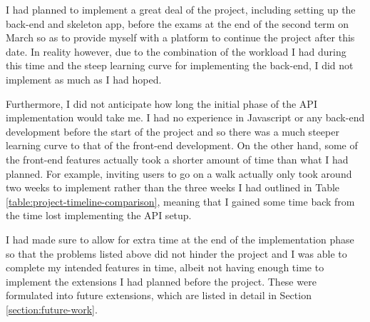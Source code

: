 I had planned to implement a great deal of the project, including setting up the back-end and skeleton app, before the exams at the end of the second term on  March so as to provide myself with a platform to continue the project after this date. In reality however, due to the combination of the workload I had during this time and the steep learning curve for implementing the back-end, I did not implement as much as I had hoped.

Furthermore, I did not anticipate how long the initial phase of the API implementation would take me. I had no experience in Javascript or any back-end development before the start of the project and so there was a much steeper learning curve to that of the front-end development. On the other hand, some of the front-end features actually took a shorter amount of time than what I had planned. For example, inviting users to go on a walk actually only took around two weeks to implement rather than the three weeks I had outlined in Table \ref{table:project-timeline-comparison}, meaning that I gained some time back from the time lost implementing the API setup.

I had made sure to allow for extra time at the end of the implementation phase so that the problems listed above did not hinder the project and I was able to complete my intended features in time, albeit not having enough time to implement the extensions I had planned before the project. These were formulated into future extensions, which are listed in detail in Section \ref{section:future-work}.


